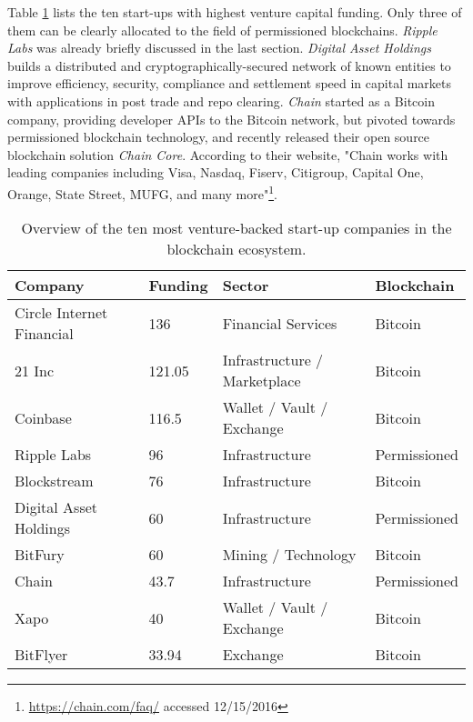 Table \ref{tbl:eco:mostfunded} lists the ten start-ups with highest venture capital funding. Only three of them can be clearly allocated to the field of permissioned blockchains. \emph{Ripple Labs} was already briefly discussed in the last section. \emph{Digital Asset Holdings} builds a distributed and cryptographically-secured network of known entities to improve efficiency, security, compliance and settlement speed in capital markets with applications in post trade and repo clearing. \emph{Chain} started as a Bitcoin company, providing developer \ac{API}s to the Bitcoin network, but pivoted towards permissioned blockchain technology, and recently released their open source blockchain solution \emph{Chain Core}. According to their website, "Chain works with leading companies including Visa, Nasdaq, Fiserv, Citigroup, Capital One, Orange, State Street, MUFG, and many more"\footnote{\url{https://chain.com/faq/} accessed 12/15/2016}.

\begin{table}\footnotesize
  \centering
  \begin{tabularx}{\textwidth}{ l p{1.8cm} X l }
    \toprule
    \textbf{Company} & \textbf{Funding \newline [M USD]} & \textbf{Sector} & \textbf{Blockchain} \\
    \midrule
    Circle Internet Financial & 136 & Financial Services & Bitcoin \\
    21 Inc & 121.05 & Infrastructure / Marketplace & Bitcoin \\
    Coinbase & 116.5 & Wallet / Vault / Exchange & Bitcoin \\
    Ripple Labs & 96 & Infrastructure & Permissioned \\
    Blockstream & 76 & Infrastructure & Bitcoin \\
    Digital Asset Holdings & 60 & Infrastructure & Permissioned \\
    BitFury & 60 & Mining / Technology & Bitcoin \\
    Chain & 43.7 & Infrastructure & Permissioned \\
    Xapo & 40 & Wallet / Vault / Exchange & Bitcoin \\
    BitFlyer & 33.94 & Exchange & Bitcoin \\
    \bottomrule
  \end{tabularx}
  \caption{Overview of the ten most venture-backed start-up companies in the blockchain ecosystem.}
  \label{tbl:eco:mostfunded}
\end{table}


